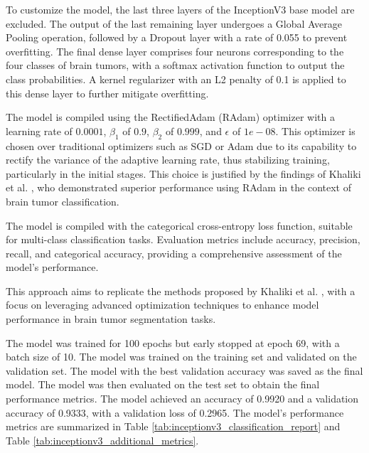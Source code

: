 To customize the model, the last three layers of the InceptionV3 base model are excluded. The output of the last remaining layer undergoes a Global Average Pooling operation, followed by a Dropout layer with a rate of 0.055 to prevent overfitting. The final dense layer comprises four neurons corresponding to the four classes of brain tumors, with a softmax activation function to output the class probabilities. A kernel regularizer with an L2 penalty of 0.1 is applied to this dense layer to further mitigate overfitting.

The model is compiled using the RectifiedAdam (RAdam) optimizer \cite{liu_variance_2019} with a learning rate of $0.0001$, $\beta_1$ of $0.9$, $\beta_2$ of $0.999$, and $\epsilon$ of $1e-08$. This optimizer is chosen over traditional optimizers such as SGD or Adam due to its capability to rectify the variance of the adaptive learning rate, thus stabilizing training, particularly in the initial stages. This choice is justified by the findings of Khaliki et al. \cite{khaliki_brain_2024}, who demonstrated superior performance using RAdam in the context of brain tumor classification.

The model is compiled with the categorical cross-entropy loss function, suitable for multi-class classification tasks. Evaluation metrics include accuracy, precision, recall, and categorical accuracy, providing a comprehensive assessment of the model's performance.

This approach aims to replicate the methods proposed by Khaliki et al. \cite{khaliki_brain_2024}, with a focus on leveraging advanced optimization techniques to enhance model performance in brain tumor segmentation tasks.

%
The model was trained for 100 epochs but early stopped at epoch 69, with a batch size of 10. The model was trained on the training set and validated on the validation set. The model with the best validation accuracy was saved as the final model. The model was then evaluated on the test set to obtain the final performance metrics. The model achieved an accuracy of 0.9920 and a validation accuracy of 0.9333, with a validation loss of 0.2965. The model's performance metrics are summarized in Table \ref{tab:inceptionv3_classification_report} and Table \ref{tab:inceptionv3_additional_metrics}.

